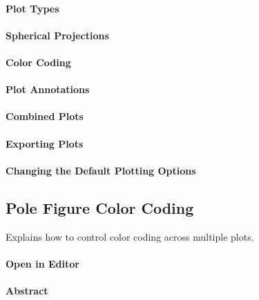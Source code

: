 \documentclass{article}
\begin{document}
			\paragraph{Plot Types}
		
			\paragraph{Spherical Projections}
		
			\paragraph{Color Coding}
		
			\paragraph{Plot Annotations}
		
			\paragraph{Combined Plots}
		
			\paragraph{Exporting Plots}
		
			\paragraph{Changing the Default Plotting Options}
		
		\subsection{Pole Figure Color Coding}

		
                     \begin{par}
Explains how to control color coding across multiple plots.
\end{par} \vspace{1em}

                  
			\paragraph{Open in Editor}
		
			\paragraph{Abstract}
		
\end{document}
